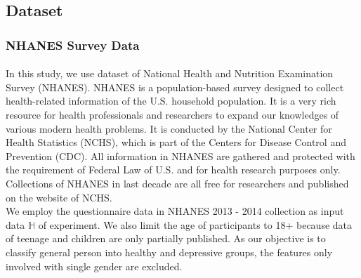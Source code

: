 \documentclass[12pt]{article}
\begin{document}
\subsection{Dataset}
\subsubsection{NHANES Survey Data}
\paragraph{}
In this study, we use dataset of National Health and Nutrition Examination Survey (NHANES). NHANES is a population-based survey designed to collect health-related information of the U.S. household population. It is a very rich resource for health professionals and researchers to expand our knowledges of various modern health problems. It is conducted by the National Center for Health Statistics (NCHS), which is part of the Centers for Disease Control and Prevention (CDC). All information in NHANES are gathered and protected with the requirement of Federal Law of U.S. and for health research purposes only. Collections of NHANES in last decade are all free for researchers and published on the website of NCHS.
\\

We employ the questionnaire data in NHANES 2013 - 2014 collection as input data $\mathbb{H}$ of experiment. We also limit the age of participants to 18+ because data of teenage and children are only partially published. As our objective is to classify general person into healthy and depressive groups, the features only involved with single gender are excluded.  
\\
\smallskip
\end{document}
